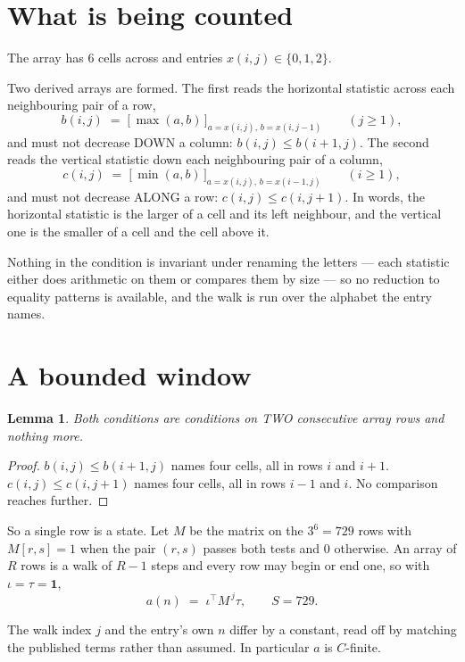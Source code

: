 \documentclass[11pt,a4paper]{article}
\theoremstyle{plain}
\newtheorem{lemma}[theorem]{Lemma}
\theoremstyle{definition}
\begin{document}
\section{What is being counted}

The array has $6$ cells across and entries $x(i,j)\in\{0,1,2\}$.

Two derived arrays are formed. The first reads the horizontal statistic across each
neighbouring pair of a row,
\[
b(i,j)\;=\;\bigl[\,\max(a,b)\,\bigr]_{a=x(i,j),\,b=x(i,j-1)}\qquad (j\ge1),
\]
and must not decrease DOWN a column: $b(i,j)\le b(i{+}1,j)$. The second reads the vertical
statistic down each neighbouring pair of a column,
\[
c(i,j)\;=\;\bigl[\,\min(a,b)\,\bigr]_{a=x(i,j),\,b=x(i{-}1,j)}\qquad (i\ge1),
\]
and must not decrease ALONG a row: $c(i,j)\le c(i,j{+}1)$. In words, the horizontal statistic
is the larger of a cell and its left neighbour, and the vertical one is
the smaller of a cell and the cell above it.

Nothing in the condition is invariant under renaming the letters --- each statistic either does
arithmetic on them or compares them by size --- so no reduction to equality patterns is
available, and the walk is run over the alphabet the entry names.

\section{A bounded window}

\begin{lemma}\label{lem:win}
Both conditions are conditions on TWO consecutive array rows and nothing more.
\end{lemma}

\begin{proof}
$b(i,j)\le b(i{+}1,j)$ names four cells, all in rows $i$ and $i+1$. $c(i,j)\le c(i,j{+}1)$
names four cells, all in rows $i-1$ and $i$. No comparison reaches further.
\end{proof}

So a single row is a state. Let $M$ be the matrix on the $3^{6}=729$ rows with
$M[r,s]=1$ when the pair $(r,s)$ passes both tests and $0$ otherwise. An array of $R$ rows is a
walk of $R-1$ steps and every row may begin or end one, so with $\iota=\tau=\mathbf{1}$,
\[
a(n)\;=\;\iota^{\!\top}M^{\,j}\tau ,\qquad S=729.
\]

The walk index $j$ and the entry's own $n$ differ by a constant, read off by matching the
published terms rather than assumed. In particular $a$ is $C$-finite.
\end{document}
